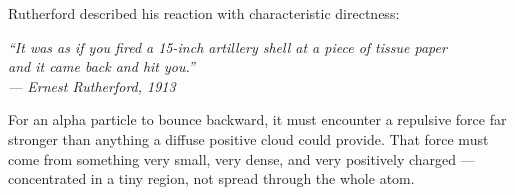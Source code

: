 \documentclass[12pt, a4paper]{book}
\theoremstyle{definition}
\begin{document}
\vspace{0.5em}

Rutherford described his reaction with characteristic directness:

\begin{center}
\begin{tcolorbox}[
  enhanced, colback=HistoryColor!8, colframe=HistoryColor!50,
  width=0.85\textwidth, arc=3pt
]
\centering\sffamily\normalsize\itshape
``It was as if you fired a 15-inch artillery shell at a piece of tissue paper\\
and it came back and hit you.''\\[4pt]
\normalfont\small\sffamily --- Ernest Rutherford, 1913
\end{tcolorbox}
\end{center}

\vspace{0.5em}

For an alpha particle to bounce backward, it must encounter
a repulsive force far stronger than anything a diffuse
positive cloud could provide.
That force must come from something very small,
very dense, and very positively charged --- concentrated
in a tiny region, not spread through the whole atom.
\end{document}
